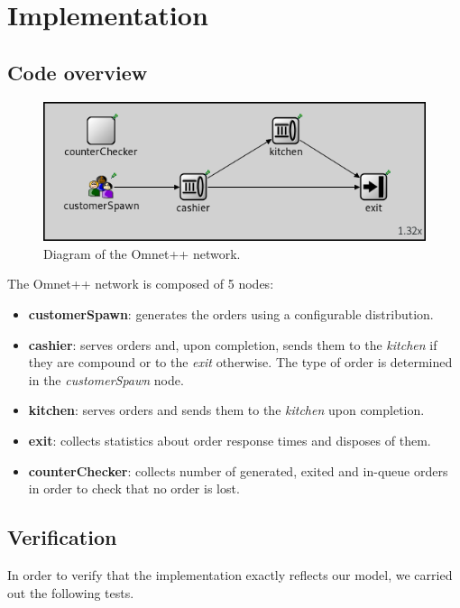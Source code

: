 \section{Implementation}

\subsection{Code overview}

\begin{figure}[h!]
    \centering
    \includegraphics[width=.75\textwidth]{figs/omnet_network.png}
    \caption{Diagram of the Omnet++ network.}
    \label{fig:omnet_network}
\end{figure}

The Omnet++ network is composed of 5 nodes:
\begin{itemize}
    \item \textbf{customerSpawn}: generates the orders using a configurable
        distribution.
    \item \textbf{cashier}: serves orders and, upon completion, sends them to 
        the \emph{kitchen} if they are compound or to the \emph{exit} otherwise.
        The type of order is determined in the \emph{customerSpawn} node.
    \item \textbf{kitchen}: serves orders and sends them to the \emph{kitchen}
        upon completion.
    \item \textbf{exit}: collects statistics about order response times and 
        disposes of them.
    \item \textbf{counterChecker}: collects number of generated, exited and 
        in-queue orders in order to check that no order is lost.
\end{itemize}


\subsection{Verification}
In order to verify that the implementation exactly reflects our model, we 
carried out the following tests.

